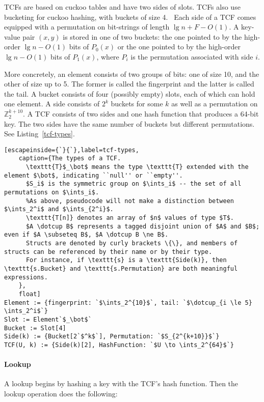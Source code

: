 \documentclass[sigconf, nonacm]{acmart}
\newcommand{\ints}{\mathbb{Z}}
\newcommand{\dotcup}{\ensuremath{\mathaccent\cdot\cup}}
\begin{document}
TCFs are based on cuckoo tables and have two sides of slots.
TCFs also use bucketing for cuckoo hashing, with buckets of size 4.~\cite{buckets}
Each side of a TCF comes equipped with a permutation on bit-strings of length $\lg n + F - O(1)$.
A key-value pair $(x, y)$ is stored in one of two buckets: the one pointed to by the high-order $\lg n - O(1)$ bits of $P_0(x)$ or the one pointed to by the high-order $\lg n - O(1)$ bits of $P_1(x)$, where $P_i$ is the permutation associated with side $i$.

More concretely, an element consists of two groups of bits: one of size 10, and the other of size up to 5.
The former is called the fingerprint and the latter is called the tail.
A bucket consists of four (possibly empty) slots, each of which can hold one element.
A side consists of $2^k$ buckets for some $k$ as well as a permutation on $\ints_2^{k+10}$. %
A TCF consists of two sides and one hash function that produces a 64-bit key.
The two sides have the same number of buckets but different permutations.
See Listing~\ref{tcf-types}.

\begin{lstlisting}[escapeinside={`}{`},label=tcf-types,
    caption={The types of a TCF.
      \texttt{T}$_\bot$ means the type \texttt{T} extended with the element $\bot$, indicating ``null'' or ``empty''.
      $S_i$ is the symmetric group on $\ints_i$ -- the set of all permutations on $\ints_i$.
      %As above, pseudocode will not make a distinction between $\ints_2^i$ and $\ints_{2^i}$.
      \texttt{T[n]} denotes an array of $n$ values of type $T$.
      $A \dotcup B$ represents a tagged disjoint union of $A$ and $B$; even if $A \subseteq B$, $A \dotcup B \ne B$.
      Structs are denoted by curly brackets \{\}, and members of structs can be referenced by their name or by their type.
      For instance, if \texttt{s} is a \texttt{Side(k)}, then \texttt{s.Bucket} and \texttt{s.Permutation} are both meaningful expressions.
    },
    float]
Element := {fingerprint: `$\ints_2^{10}$`, tail: `$\dotcup_{i \le 5} \ints_2^i$`}
Slot := Element`$_\bot$`
Bucket := Slot[4]
Side(k) := {Bucket[2`$^k$`], Permutation: `$S_{2^{k+10}}$`}
TCF(U, k) := {Side(k)[2], HashFunction: `$U \to \ints_2^{64}$`}
\end{lstlisting}

\paragraph{Lookup}
A lookup begins by hashing a key with the TCF's hash function.
Then the lookup operation does the following:
\end{document}
